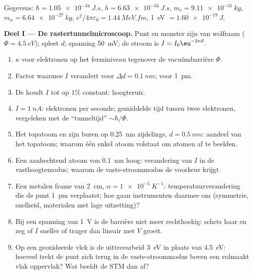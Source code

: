 \begin{problem}\label{pb:b2:potential-wells-tunneling:1}
Gegevens: $\hbar = \qty{1.05e-34}{J.s}$, $h = \qty{6.63e-34}{J.s}$,
$m_{\text{e}} =
\qty{9.11e-31}{kg}$, $m_\alpha = \qty{6.64e-27}{kg}$,
$e^2/4\pi\varepsilon_0 =
\qty{1.44}{MeV.fm}$, \qty{1}{eV}
$= \qty{1.60e-19}{J}$.

\textbf{Deel I --- De rastertunnelmicroscoop.}
Punt en monster zijn van wolfraam ($\Phi = \qty{4.5}{eV}$); spleet $d$; spanning
\qty{50}{mV}; de stroom is $I = I_0\eu^{-2\kappa d}$.
\begin{enumerate}
  \item $\kappa$ voor elektronen op het ferminiveau tegenover de
        vacuümbarrière $\Phi$.
  \item Factor waarmee $I$ verandert voor $\Delta d = \qty{0.1}{nm}$; voor
        \qty{1}{pm}.
  \item De  houdt $I$ tot op $1\%$ constant: hoogteruis.
  \item $I = \qty{1}{nA}$: elektronen per seconde; gemiddelde tijd tussen twee
        elektronen, vergeleken met de ``tunneltijd'' $\sim\hbar/\Phi$.
  \item Het topatoom en zijn buren op \qty{0.25}{nm} zijdelings,
        $d = \qty{0.5}{nm}$: aandeel van het topatoom; waarom één enkel atoom
        volstaat om atomen af te beelden.
  \item Een aanhechtend atoom van \qty{0.1}{nm} hoog: verandering van $I$ in
        de vasthoogtemodus; waarom de vaste-stroommodus de voorkeur krijgt.
  \item Een metalen frame van \qty{2}{cm}, $\alpha = \qty{1e-5}{K^{-1}}$:
        temperatuur\-verandering
        die de punt \qty{1}{pm} verplaatst; hoe gaan instrumenten
        daarmee om (symmetrie, snelheid, materialen met lage uitzetting)?
  \item Bij een spanning van \qty{1}{V} is de barrière niet meer rechthoekig:
        schets haar en zeg of $I$ sneller of trager dan
        lineair met $V$ groeit.
  \item Op een geoxideerde vlek is de uittreearbeid \qty{3}{eV} in plaats
        van \qty{4.5}{eV}: hoeveel trekt de punt zich terug in
        de vaste-stroommodus boven een volmaakt vlak oppervlak? Wat beeldt
        de STM dan af?
\end{enumerate}


\end{problem}
